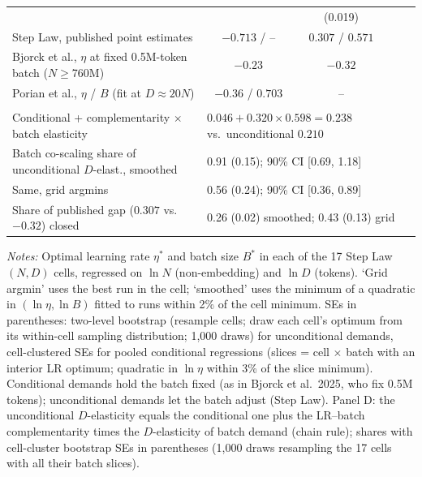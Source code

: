 \begin{table}[htbp]
\begin{threeparttable}
\begin{tabular}{lcccc}
 & & (0.019) & &  \\
Step Law, published point estimates & $-0.713$ / -- & $0.307$ / $0.571$ & &  \\
Bjorck et al., $\eta$ at fixed 0.5M-token batch ($N\geq$760M) & $-0.23$ & $-0.32$ & &  \\
Porian et al., $\eta$ / $B$ (fit at $D\approx 20N$) & $-0.36$ / $0.703$ & -- & &  \\
\addlinespace
\multicolumn{5}{l}{\textit{Panel D. Le Chatelier decomposition of $d\ln\eta^*/d\ln D$}} \\
Conditional + complementarity $\times$ batch elasticity & \multicolumn{4}{l}{$0.046 + 0.320\times0.598 = 0.238$ vs.\ unconditional $0.210$} \\
Batch co-scaling share of unconditional $D$-elast., smoothed & \multicolumn{4}{l}{0.91 (0.15); 90\% CI [0.69, 1.18]} \\
Same, grid argmins & \multicolumn{4}{l}{0.56 (0.24); 90\% CI [0.36, 0.89]} \\
Share of published gap ($0.307$ vs.\ $-0.32$) closed & \multicolumn{4}{l}{0.26 (0.02) smoothed; 0.43 (0.13) grid} \\
\bottomrule
\end{tabular}
\begin{tablenotes}[flushleft]
\footnotesize
\item \textit{Notes:} Optimal learning rate $\eta^*$ and batch size $B^*$ in each of the 17 Step Law $(N,D)$ cells, regressed on $\ln N$ (non-embedding) and $\ln D$ (tokens). `Grid argmin' uses the best run in the cell; `smoothed' uses the minimum of a quadratic in $(\ln\eta,\ln B)$ fitted to runs within 2\% of the cell minimum. SEs in parentheses: two-level bootstrap (resample cells; draw each cell's optimum from its within-cell sampling distribution; 1,000 draws) for unconditional demands, cell-clustered SEs for pooled conditional regressions (slices = cell $\times$ batch with an interior LR optimum; quadratic in $\ln\eta$ within 3\% of the slice minimum). Conditional demands hold the batch fixed (as in Bjorck et al.\ 2025, who fix 0.5M tokens); unconditional demands let the batch adjust (Step Law). Panel D: the unconditional $D$-elasticity equals the conditional one plus the LR--batch complementarity times the $D$-elasticity of batch demand (chain rule); shares with cell-cluster bootstrap SEs in parentheses (1,000 draws resampling the 17 cells with all their batch slices).
\end{tablenotes}
\end{threeparttable}
\end{table}
